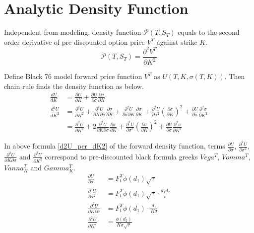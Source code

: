 \documentclass{article}
\begin{document}
\section{Analytic Density Function}

Independent from modeling, density function $ \mathcal{P}\left(T, S_T\right) $ equals to the second order derivative of pre-discounted option price $ V^T $ against strike $ K $.
\begin{equation}
    \mathcal{P}\left(T, S_T\right) = \frac{\partial^2 V^T}{\partial K^2}
\end{equation}

Define Black 76 model forward price function $ V^T $ as $ U\left(T, K, \sigma(T, K)\right) $.
Then chain rule finds the density function as below.
\begin{align}
    \frac{d U}{d K} &= \frac{\partial U}{\partial K} + \frac{\partial U}{\partial \sigma} \frac{\partial \sigma}{\partial K} \\
    \frac{d^2 U}{d K^2} &= \frac{\partial^2 U}{\partial K^2} + \frac{\partial^2 U}{\partial K \partial \sigma} \frac{\partial \sigma}{\partial K}  + \frac{\partial^2 U}{\partial \sigma \partial K} \frac{\partial \sigma}{\partial K} + \frac{\partial^2 U}{\partial \sigma^2} \left(\frac{\partial \sigma}{\partial K}\right)^2 + \frac{\partial U}{\partial \sigma} \frac{\partial^2 \sigma}{\partial K^2} \nonumber \\
    &= \frac{\partial^2 U}{\partial K^2} + 2 \frac{\partial^2 U}{\partial K \partial \sigma} \frac{\partial \sigma}{\partial K} + \frac{\partial^2 U}{\partial \sigma^2} \left(\frac{\partial \sigma}{\partial K}\right)^2 + \frac{\partial U}{\partial \sigma} \frac{\partial^2 \sigma}{\partial K^2} \label{d2U_per_dK2}
\end{align}

In above formula \ref{d2U_per_dK2} of the forward density function, terms $ \frac{\partial U}{\partial \sigma} $, $ \frac{\partial^2 U}{\partial \sigma^2} $, $ \frac{\partial^2 U}{\partial K \partial \sigma} $ and $ \frac{\partial^2 U}{\partial K^2} $ correspond to pre-discounted black formula greeks $ Vega^T $, $ Vomma^T $, $ Vanna_{K}^T $ and $ Gamma_{K}^T $.
\begin{subequations}
    \begin{align}
        \frac{\partial U}{\partial \sigma} &= F_{t}^{T} \phi(d_1) \sqrt{\tau} \\
        \frac{\partial^2 U}{\partial \sigma^2} &= F_{t}^{T} \phi(d_1) \sqrt{\tau} \cdot \frac{d_1 d_2}{\sigma} \\
        \frac{\partial^2 U}{\partial K \partial \sigma} &= F_{t}^{T} \phi(d_1) \cdot \frac{d_1}{K \sigma} \\
        \frac{\partial^2 U}{\partial K^2} &= \frac{\phi(d_2)}{K \sigma \sqrt{\tau}}
    \end{align}
\end{subequations}
\end{document}
